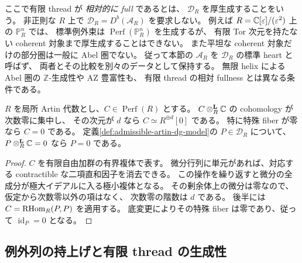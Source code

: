 ここで有限 thread が \emph{相対的に full} であるとは、
$\mathcal D_R$ を厚生成することをいう。
非正則な $R$ 上で $\mathcal D_R=D^b(\mathcal A_R)$ を要求しない。
例えば $R=\mathbb C[\varepsilon]/(\varepsilon^2)$ 上の $\mathbb P^n_R$ では、
標準例外束は $\operatorname{Perf}(\mathbb P^n_R)$ を生成するが、
有限 Tor 次元を持たない coherent 対象まで厚生成することはできない。
また平坦な coherent 対象だけの部分圏は一般に Abel 圏でない。
従って本節の $\mathcal A_R$ を $\mathcal D_R$ の標準 heart と呼ばず、
両者とその比較を別々のデータとして保持する。
無限 helix による Abel 圏の $\mathbb Z$-生成性や AZ 豊富性も、
有限 thread の相対 fullness とは異なる条件である。

\begin{lemma}
\label{lem:artin-perfect-nakayama}
$R$ を局所 Artin 代数とし、$C\in\operatorname{Perf}(R)$ とする。
$C\otimes_R^{\mathbf L}\mathbb C$ の cohomology が次数零に集中し、
その次元が $d$ なら $C\simeq R^{\oplus d}[0]$ である。
特に特殊 fiber が零なら $C=0$ である。
定義\ref{def:admissible-artin-dg-model}の $P\in\mathcal D_R$ について、
$P\otimes_R^{\mathbf L}\mathbb C=0$ なら $P=0$ である。
\end{lemma}
\begin{proof}
$C$ を有限自由加群の有界複体で表す。
微分行列に単元があれば、対応する contractible な二項直和因子を消去できる。
この操作を繰り返すと微分の全成分が極大イデアルに入る極小複体となる。
その剰余体上の微分は零なので、仮定から次数零以外の項はなく、
次数零の階数は $d$ である。
後半には $C=\operatorname{RHom}_R(P,P)$ を適用する。
底変更によりその特殊 fiber は零であり、従って $\operatorname{id}_P=0$ となる。
\end{proof}

\subsection{例外列の持上げと有限 thread の生成性}

